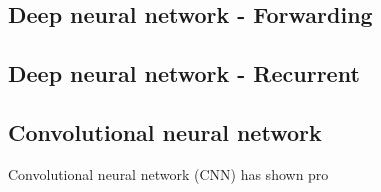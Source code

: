 \subsection{Deep neural network - Forwarding}
\subsection{Deep neural network - Recurrent}
\subsection{Convolutional neural network}
Convolutional neural network (CNN) has shown pro